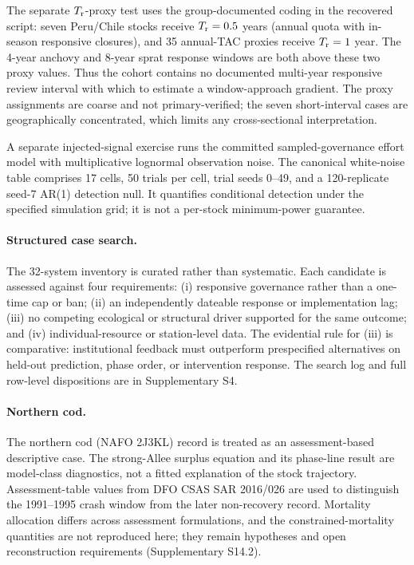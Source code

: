 The separate \(T_{\mathrm r}\)-proxy test uses the group-documented coding in the recovered script: seven Peru/Chile stocks receive \(T_{\mathrm r}=0.5\) years (annual quota with in-season responsive closures), and 35 annual-TAC proxies receive \(T_{\mathrm r}=1\) year. The 4-year anchovy and 8-year sprat response windows are both above these two proxy values. Thus the cohort contains no documented multi-year responsive review interval with which to estimate a window-approach gradient. The proxy assignments are coarse and not primary-verified; the seven short-interval cases are geographically concentrated, which limits any cross-sectional interpretation.

A separate injected-signal exercise runs the committed sampled-governance effort model with multiplicative lognormal observation noise. The canonical white-noise table comprises 17 cells, 50 trials per cell, trial seeds 0--49, and a 120-replicate seed-7 AR(1) detection null. It quantifies conditional detection under the specified simulation grid; it is not a per-stock minimum-power guarantee.

\paragraph{Structured case search.} The 32-system inventory is curated rather than systematic. Each candidate is assessed against four requirements: (i) responsive governance rather than a one-time cap or ban; (ii) an independently dateable response or implementation lag; (iii) no competing ecological or structural driver supported for the same outcome; and (iv) individual-resource or station-level data. The evidential rule for (iii) is comparative: institutional feedback must outperform prespecified alternatives on held-out prediction, phase order, or intervention response. The search log and full row-level dispositions are in Supplementary S4.

\paragraph{Northern cod.} The northern cod (NAFO 2J3KL) record is treated as an assessment-based descriptive case. The strong-Allee surplus equation and its phase-line result are model-class diagnostics, not a fitted explanation of the stock trajectory. Assessment-table values from DFO CSAS SAR 2016/026 are used to distinguish the 1991--1995 crash window from the later non-recovery record. Mortality allocation differs across assessment formulations, and the constrained-mortality quantities are not reproduced here; they remain hypotheses and open reconstruction requirements (Supplementary S14.2).

